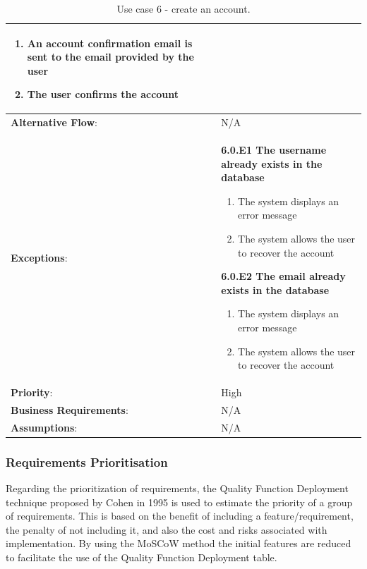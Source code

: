 \begin{table}[H]
\begin{adjustbox}{width=1.2\textwidth,center=\textwidth}
\begin{tabular}{|m{4cm}|m{12cm}|}
\begin{enumerate}
                \item An account confirmation email is sent to the email provided by the user
                \item The user confirms the account
            \end{enumerate} \\
            \hline
            \textbf{Alternative Flow}: & N/A \\
            \hline
            \textbf{Exceptions}: & \textbf{6.0.E1  The username already exists in the database}
            \begin{enumerate}
                \item The system displays an error message
                \item The system allows the user to recover the account
            \end{enumerate}
            \textbf{6.0.E2 The email already exists in the database}
            \begin{enumerate}
                \item The system displays an error message
                \item The system allows the user to recover the account
            \end{enumerate} \\
            \hline
            \textbf{Priority}: & High \\
            \hline
            \textbf{Business Requirements}: & N/A \\
            \hline
            \textbf{Assumptions}: & N/A \\
            \hline
        \end{tabular}
    \end{adjustbox}
    \vspace{1em}
    \caption{Use case 6 - create an account.}
    \label{table:use_case6}
\end{table}

\vspace*{\fill}

\subsubsection{Requirements Prioritisation}

Regarding the prioritization of requirements, the Quality Function Deployment technique
proposed by Cohen in 1995 \cite{cohen1995quality} is used to estimate the priority of a group of requirements.
This is based on the benefit of including a feature/requirement, the penalty of not including
it, and also the cost and risks associated with implementation. By using the MoSCoW method \cite{clegg1994case} the
initial features are reduced to facilitate the use of the Quality Function Deployment table.

